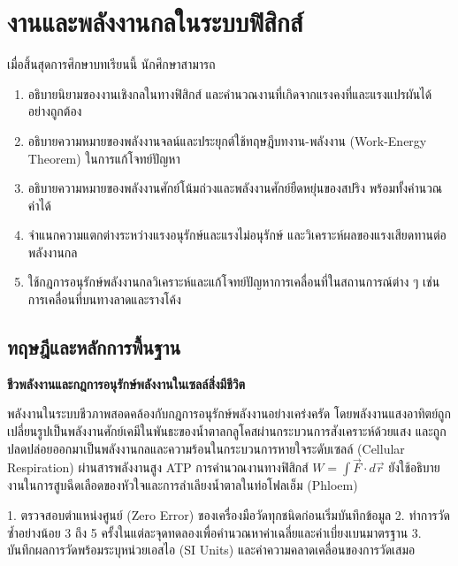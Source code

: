 \chapter{งานและพลังงานกลในระบบฟิสิกส์}
\label{ch:ch07_work_energy}

\begin{conceptbox}[title=วัตถุประสงค์การเรียนรู้ประจำบท]
เมื่อสิ้นสุดการศึกษาบทเรียนนี้ นักศึกษาสามารถ
\begin{enumerate}
    \item อธิบายนิยามของงานเชิงกลในทางฟิสิกส์ และคำนวณงานที่เกิดจากแรงคงที่และแรงแปรผันได้อย่างถูกต้อง
    \item อธิบายความหมายของพลังงานจลน์และประยุกต์ใช้ทฤษฎีบทงาน-พลังงาน (Work-Energy Theorem) ในการแก้โจทย์ปัญหา
    \item อธิบายความหมายของพลังงานศักย์โน้มถ่วงและพลังงานศักย์ยืดหยุ่นของสปริง พร้อมทั้งคำนวณค่าได้
    \item จำแนกความแตกต่างระหว่างแรงอนุรักษ์และแรงไม่อนุรักษ์ และวิเคราะห์ผลของแรงเสียดทานต่อพลังงานกล
    \item ใช้กฎการอนุรักษ์พลังงานกลวิเคราะห์และแก้โจทย์ปัญหาการเคลื่อนที่ในสถานการณ์ต่าง ๆ เช่น การเคลื่อนที่บนทางลาดและรางโค้ง
\end{enumerate}
\end{conceptbox}

\section{ทฤษฎีและหลักการพื้นฐาน}

\begin{bioappbox}
\textbf{ชีวพลังงานและกฎการอนุรักษ์พลังงานในเซลล์สิ่งมีชีวิต}

พลังงานในระบบชีวภาพสอดคล้องกับกฎการอนุรักษ์พลังงานอย่างเคร่งครัด โดยพลังงานแสงอาทิตย์ถูกเปลี่ยนรูปเป็นพลังงานศักย์เคมีในพันธะของน้ำตาลกลูโคสผ่านกระบวนการสังเคราะห์ด้วยแสง และถูกปลดปล่อยออกมาเป็นพลังงานกลและความร้อนในกระบวนการหายใจระดับเซลล์ (Cellular Respiration) ผ่านสารพลังงานสูง ATP การคำนวณงานทางฟิสิกส์ $W = \int \vec{F} \cdot d\vec{r}$ ยังใช้อธิบายงานในการสูบฉีดเลือดของหัวใจและการลำเลียงน้ำตาลในท่อโฟลเอ็ม (Phloem)
\end{bioappbox}

\begin{labbox}
1. ตรวจสอบตำแหน่งศูนย์ (Zero Error) ของเครื่องมือวัดทุกชนิดก่อนเริ่มบันทึกข้อมูล
2. ทำการวัดซ้ำอย่างน้อย 3 ถึง 5 ครั้งในแต่ละจุดทดลองเพื่อคำนวณหาค่าเฉลี่ยและค่าเบี่ยงเบนมาตรฐาน
3. บันทึกผลการวัดพร้อมระบุหน่วยเอสไอ (SI Units) และค่าความคลาดเคลื่อนของการวัดเสมอ
\end{labbox}

